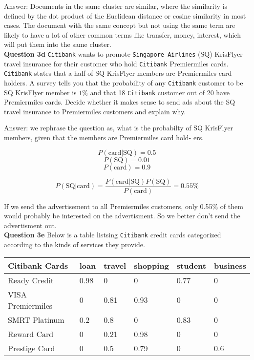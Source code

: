 \documentclass[11pt,a4paper]{report}
\begin{document}
\begin{multicols*}{2}
\noindent Answer: Documents in the same cluster are similar, where the similarity is defined by the dot product of the Euclidean distance or cosine similarity in most cases. The document with the same concept but not using the same term are likely to have a lot of other common terms like transfer, money, interest, which will put them into the same cluster. \\

\noindent \textbf{Question 3d} \verb|Citibank|  wants to promote \verb|Singapore Airlines| (SQ) KrisFlyer travel insurance for their customer who hold \verb|Citibank| Premiermiles cards. \verb|Citibank| states that a half of SQ KrisFlyer members are Premiermiles card holders. A survey tells you that the probability of any \verb|Citibank| customer to be SQ KrisFlyer member is $1\%$ and that 18 \verb|Citibank| customer out of 20 have Premiermiles cards. Decide whether it makes sense to send ads about the SQ travel insurance to Premiermiles customers and explain why. 

\noindent Answer: we rephrase the question as, what is the probabilty of SQ KrisFlyer members, given that the members are Premiermiles card hold- ers.

$$P(\text{card} | \text{SQ}) = 0.5$$
$$P(\text{SQ}) = 0.01$$
$$P(\text{card}) = 0.9$$

$$P(\text{SQ} | \text{card}) = \frac{P(\text{card} | \text{SQ}) P(\text{SQ})}{P(\text{card})} = 0.55\%$$

\noindent If we send the advertisement to all Premiermiles customers, only 0.55\% of them would probably be interested on the advertisment. So we better don't send the advertisment out. \\

\noindent \textbf{Question 3e} Below is a table listsing \verb|Citibank| credit cards categorized according to the kinds of services they provide.

\tiny
\begin{center}
\begin{tabular}{|l | l | l | l | l | l |}
    \hline
    Citibank Cards & loan & travel & shopping & student & business \\
    \hline
    Ready Credit   & 0.98 & 0      & 0        & 0.77    & 0 \\
    VISA Premiermiles & 0 & 0.81   & 0.93     & 0       & 0 \\
    SMRT Platinum  & 0.2  & 0.8    & 0        & 0.83    & 0 \\
    Reward Card    & 0    & 0.21   & 0.98     & 0       & 0 \\
    Prestige Card  & 0    & 0.5    & 0.79     & 0       & 0.6\\
    \hline
\end{tabular}
\end{center}
\normalsize


\end{multicols*}
\end{document}

